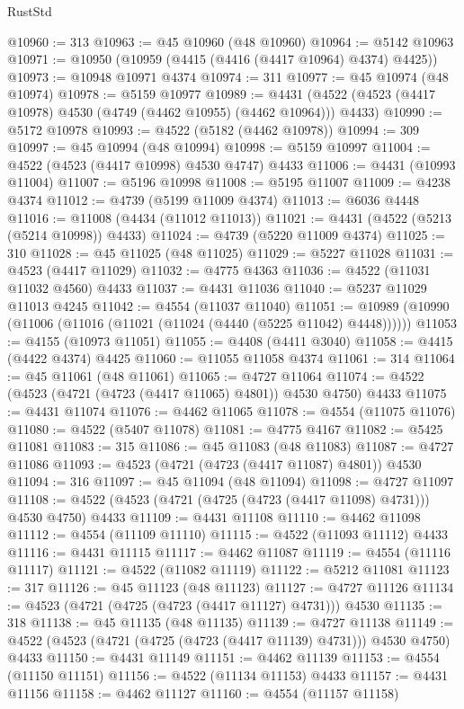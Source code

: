 \begin{lexlean}{RustStd}
\begin{coremodule}
@10960 := 313
@10963 := @45 @10960 (@48 @10960)
@10964 := @5142 @10963
@10971 := @10950 (@10959 (@4415 (@4416 (@4417 @10964) @4374) @4425))
@10973 := @10948 @10971 @4374
@10974 := 311
@10977 := @45 @10974 (@48 @10974)
@10978 := @5159 @10977
@10989 := @4431 (@4522 (@4523 (@4417 @10978) @4530 (@4749 (@4462 @10955) (@4462 @10964))) @4433)
@10990 := @5172 @10978
@10993 := @4522 (@5182 (@4462 @10978))
@10994 := 309
@10997 := @45 @10994 (@48 @10994)
@10998 := @5159 @10997
@11004 := @4522 (@4523 (@4417 @10998) @4530 @4747) @4433
@11006 := @4431 (@10993 @11004)
@11007 := @5196 @10998
@11008 := @5195 @11007
@11009 := @4238 @4374
@11012 := @4739 (@5199 @11009 @4374)
@11013 := @6036 @4448
@11016 := @11008 (@4434 (@11012 @11013))
@11021 := @4431 (@4522 (@5213 (@5214 @10998)) @4433)
@11024 := @4739 (@5220 @11009 @4374)
@11025 := 310
@11028 := @45 @11025 (@48 @11025)
@11029 := @5227 @11028
@11031 := @4523 (@4417 @11029)
@11032 := @4775 @4363
@11036 := @4522 (@11031 @11032 @4560) @4433
@11037 := @4431 @11036
@11040 := @5237 @11029 @11013 @4245
@11042 := @4554 (@11037 @11040)
@11051 := @10989 (@10990 (@11006 (@11016 (@11021 (@11024 (@4440 (@5225 @11042) @4448))))))
@11053 := @4155 (@10973 @11051)
@11055 := @4408 (@4411 @3040)
@11058 := @4415 (@4422 @4374) @4425
@11060 := @11055 @11058 @4374
@11061 := 314
@11064 := @45 @11061 (@48 @11061)
@11065 := @4727 @11064
@11074 := @4522 (@4523 (@4721 (@4723 (@4417 @11065) @4801)) @4530 @4750) @4433
@11075 := @4431 @11074
@11076 := @4462 @11065
@11078 := @4554 (@11075 @11076)
@11080 := @4522 (@5407 @11078)
@11081 := @4775 @4167
@11082 := @5425 @11081
@11083 := 315
@11086 := @45 @11083 (@48 @11083)
@11087 := @4727 @11086
@11093 := @4523 (@4721 (@4723 (@4417 @11087) @4801)) @4530
@11094 := 316
@11097 := @45 @11094 (@48 @11094)
@11098 := @4727 @11097
@11108 := @4522 (@4523 (@4721 (@4725 (@4723 (@4417 @11098) @4731))) @4530 @4750) @4433
@11109 := @4431 @11108
@11110 := @4462 @11098
@11112 := @4554 (@11109 @11110)
@11115 := @4522 (@11093 @11112) @4433
@11116 := @4431 @11115
@11117 := @4462 @11087
@11119 := @4554 (@11116 @11117)
@11121 := @4522 (@11082 @11119)
@11122 := @5212 @11081
@11123 := 317
@11126 := @45 @11123 (@48 @11123)
@11127 := @4727 @11126
@11134 := @4523 (@4721 (@4725 (@4723 (@4417 @11127) @4731))) @4530
@11135 := 318
@11138 := @45 @11135 (@48 @11135)
@11139 := @4727 @11138
@11149 := @4522 (@4523 (@4721 (@4725 (@4723 (@4417 @11139) @4731))) @4530 @4750) @4433
@11150 := @4431 @11149
@11151 := @4462 @11139
@11153 := @4554 (@11150 @11151)
@11156 := @4522 (@11134 @11153) @4433
@11157 := @4431 @11156
@11158 := @4462 @11127
@11160 := @4554 (@11157 @11158)

\end{coremodule}
\end{lexlean}
